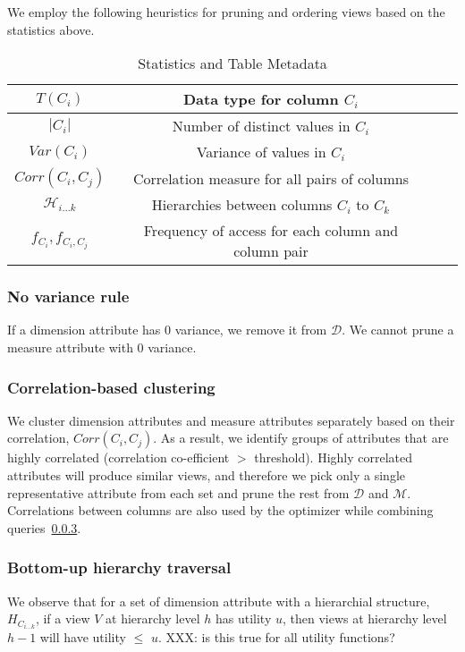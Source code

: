 We employ the following heuristics for pruning and ordering views based on the
statistics above.

\begin{table}
{\scriptsize \center
\vspace{-10pt}
\begin{tabular}{|c|c|c|c|}
\hline
$T(C_i)$ & Data type for column $C_i$ \\ \hline
$|C_i|$ & Number of distinct values in $C_i$ \\
\hline $Var(C_i)$ & Variance of values in $C_i$ \\ \hline
$Corr(C_i, C_j)$ & Correlation measure for all pairs of columns \\ \hline
$\mathcal{H}_{i\ldots k}$ & Hierarchies between columns $C_i$ to $C_k$ \\ \hline
$f_{C_i}, f_{C_i, C_j}$ & Frequency of access for each column and column pair \\
\hline
\end{tabular} 
\vspace{-10pt}
\caption{Statistics and Table Metadata \label{tab:statistics}}
}
\end{table}

\subsubsection{No variance rule}
If a dimension attribute has 0 variance, we
  remove it from $\mathcal{D}$. We cannot prune a measure attribute with 0
  variance.
  
\subsubsection{Correlation-based clustering}
We cluster dimension attributes and
  measure attributes separately based on their correlation, $Corr(C_i, C_j)$. As
  a result, we identify groups of attributes that are highly correlated
  (correlation co-efficient $>$ threshold). Highly correlated attributes will
  produce similar views, and therefore we pick only a single representative
  attribute from each set and prune the rest from $\mathcal{D}$ and
  $\mathcal{M}$. Correlations between columns are also used by the optimizer
  while combining queries~\ref{}.
  
\subsubsection{Bottom-up hierarchy traversal}
We observe that for a set of
  dimension attribute with a hierarchial structure, $H_{C_{i\ldots k}}$, if a
  view $V$ at hierarchy level $h$ has utility $u$, then views at hierarchy level
  $h-1$ will have utility $\leq$ $u$. XXX: is this true for all utility
  functions?
  
